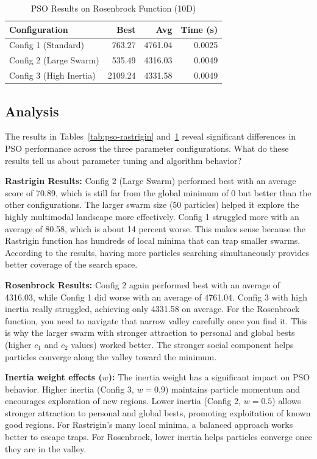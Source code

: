 \documentclass[letterpaper]{article}
\begin{document}
\begin{table}[h]
\centering
\caption{PSO Results on Rosenbrock Function (10D)}
\label{tab:pso-rosenbrock}
\begin{tabular}{@{}lrrr@{}}
\toprule
\textbf{Configuration} & \textbf{Best} & \textbf{Avg} & \textbf{Time (s)} \\
\midrule
Config 1 (Standard) & 763.27 & 4761.04 & 0.0025 \\
Config 2 (Large Swarm) & 535.49 & 4316.03 & 0.0049 \\
Config 3 (High Inertia) & 2109.24 & 4331.58 & 0.0049 \\
\bottomrule
\end{tabular}
\end{table}

\subsection{Analysis}

The results in Tables~\ref{tab:pso-rastrigin} and~\ref{tab:pso-rosenbrock} reveal significant differences in PSO performance across the three parameter configurations. What do these results tell us about parameter tuning and algorithm behavior?

\textbf{Rastrigin Results:} Config 2 (Large Swarm) performed best with an average score of 70.89, which is still far from the global minimum of 0 but better than the other configurations. The larger swarm size (50 particles) helped it explore the highly multimodal landscape more effectively. Config 1 struggled more with an average of 80.58, which is about 14 percent worse. This makes sense because the Rastrigin function has hundreds of local minima that can trap smaller swarms. According to the results, having more particles searching simultaneously provides better coverage of the search space.

\textbf{Rosenbrock Results:} Config 2 again performed best with an average of 4316.03, while Config 1 did worse with an average of 4761.04. Config 3 with high inertia really struggled, achieving only 4331.58 on average. For the Rosenbrock function, you need to navigate that narrow valley carefully once you find it. This is why the larger swarm with stronger attraction to personal and global bests (higher $c_1$ and $c_2$ values) worked better. The stronger social component helps particles converge along the valley toward the minimum.

\textbf{Inertia weight effects (}$w$\textbf{):} The inertia weight has a significant impact on PSO behavior. Higher inertia (Config 3, $w=0.9$) maintains particle momentum and encourages exploration of new regions. Lower inertia (Config 2, $w=0.5$) allows stronger attraction to personal and global bests, promoting exploitation of known good regions. For Rastrigin's many local minima, a balanced approach works better to escape traps. For Rosenbrock, lower inertia helps particles converge once they are in the valley.
\end{document}
